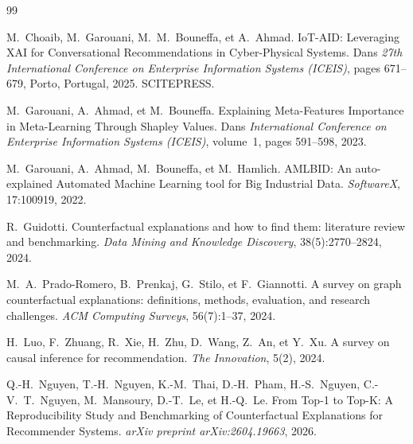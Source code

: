 \documentclass{article}
\begin{document}
\begin{thebibliography}{99}

M.~Choaib, M.~Garouani, M.~M.~Bouneffa, et A.~Ahmad.
\newblock IoT-AID: Leveraging XAI for Conversational Recommendations in Cyber-Physical Systems.
\newblock Dans \emph{27th International Conference on Enterprise Information Systems (ICEIS)}, pages 671--679, Porto, Portugal, 2025. SCITEPRESS.

M.~Garouani, A.~Ahmad, et M.~Bouneffa.
\newblock Explaining Meta-Features Importance in Meta-Learning Through Shapley Values.
\newblock Dans \emph{International Conference on Enterprise Information Systems (ICEIS)}, volume~1, pages 591--598, 2023.

M.~Garouani, A.~Ahmad, M.~Bouneffa, et M.~Hamlich.
\newblock AMLBID: An auto-explained Automated Machine Learning tool for Big Industrial Data.
\newblock \emph{SoftwareX}, 17:100919, 2022.

R.~Guidotti.
\newblock Counterfactual explanations and how to find them: literature review and benchmarking.
\newblock \emph{Data Mining and Knowledge Discovery}, 38(5):2770--2824, 2024.

M.~A.~Prado-Romero, B.~Prenkaj, G.~Stilo, et F.~Giannotti.
\newblock A survey on graph counterfactual explanations: definitions, methods, evaluation, and research challenges.
\newblock \emph{ACM Computing Surveys}, 56(7):1--37, 2024.

H.~Luo, F.~Zhuang, R.~Xie, H.~Zhu, D.~Wang, Z.~An, et Y.~Xu.
\newblock A survey on causal inference for recommendation.
\newblock \emph{The Innovation}, 5(2), 2024.

Q.-H.~Nguyen, T.-H.~Nguyen, K.-M.~Thai, D.-H.~Pham, H.-S.~Nguyen, C.-V.~T.~Nguyen, M.~Mansoury, D.-T.~Le, et H.-Q.~Le.
\newblock From Top-1 to Top-K: A Reproducibility Study and Benchmarking of Counterfactual Explanations for Recommender Systems.
\newblock \emph{arXiv preprint arXiv:2604.19663}, 2026.

\end{thebibliography}
\end{document}
